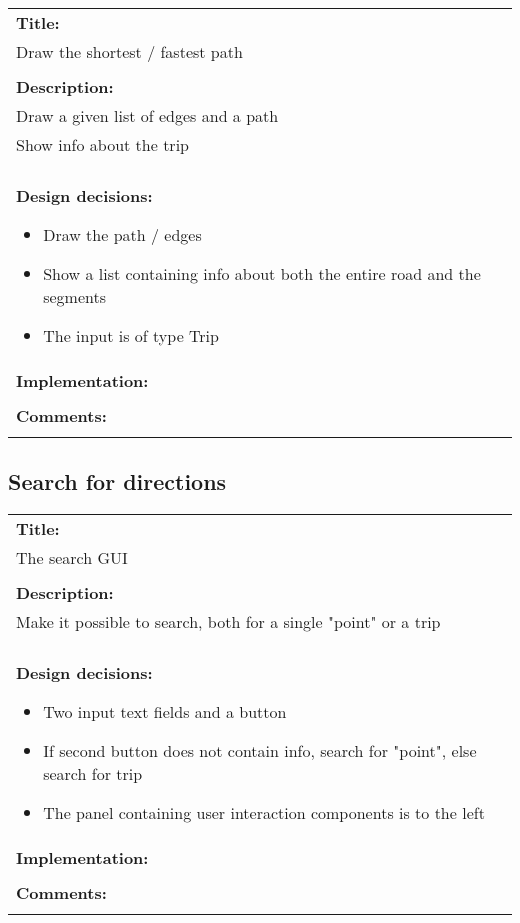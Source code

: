 \pagebreak
\begin{tabular}{ | p{12cm} | }
	\hline
	\textbf{Title:} \\
	Draw the shortest / fastest path \\
	\\ \hline
	\textbf{Description:} \\
	Draw a given list of edges and a path \\
	Show info about the trip \\
	\\ \hline
	\textbf{Design decisions:}
	\begin{itemize}
		\item Draw the path / edges
		\item Show a list containing info about both the entire road and the segments
		\item The input is of type Trip
	\end{itemize}
	\\ \hline
	\textbf{Implementation:} \\
	\\ \hline
	\textbf{Comments:} \\
	\\ \hline
\end{tabular}

\pagebreak

\subsection*{Search for directions}
\begin{tabular}{ | p{12cm} | }
	\hline
	\textbf{Title:} \\
	The search GUI \\
	\\ \hline
	\textbf{Description:} \\
	Make it possible to search, both for a single "point" or a trip \\
	\\ \hline
	\textbf{Design decisions:}
	\begin{itemize}
		\item Two input text fields and a button
		\item If second button does not contain info, search for "point", else search for trip
		\item The panel containing user interaction components is to the left
	\end{itemize}
	\\ \hline
	\textbf{Implementation:} \\
	\\ \hline
	\textbf{Comments:} \\
	\\ \hline
\end{tabular}

